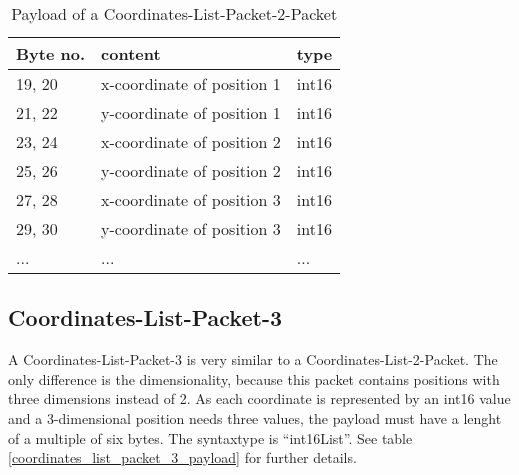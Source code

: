 \begin{table}[htdp]
  \begin{center}
    \begin{tabular}{l|l|l}
      \textbf{Byte no.} & \textbf{content} & \textbf{type} \\
      \hline
      \hline
      19, 20 & x-coordinate of position 1 & int16 \\
      \hline
      21, 22 & y-coordinate of position 1 & int16 \\
      \hline
      23, 24 & x-coordinate of position 2 & int16 \\
      \hline
      25, 26 & y-coordinate of position 2 & int16 \\
      \hline
      27, 28 & x-coordinate of position 3 & int16 \\
      \hline
      29, 30 & y-coordinate of position 3 & int16 \\
      \hline
      ... & ... & ... \\
    \end{tabular}
    \caption{Payload of a Coordinates-List-Packet-2-Packet}
    \label{coordinates_list_packet_2_payload}
  \end{center}
\end{table}


\subsection{Coordinates-List-Packet-3}
\label{subsection:coordiantes-list-packet-3}

A Coordinates-List-Packet-3 is very similar to a Coordinates-List-2-Packet. The only difference is the dimensionality, because
this packet contains positions with three dimensions instead of 2. As each coordinate is represented by an int16 value and
a 3-dimensional position needs three values, the payload must have a lenght of a multiple of six bytes. The syntaxtype is
``int16List''. See table \ref{coordinates_list_packet_3_payload} for further details.

